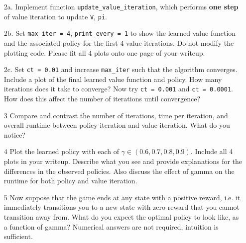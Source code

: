 \documentclass[submit]{harvardml}
\begin{document}
\begin{framed}
\begin{itemize}
    \item [2a.] Implement function
      \texttt{update\_value\_iteration}, which performs \textbf{one step} of value iteration to update \texttt{V}, \texttt{pi}.
      
    \item [2b.] Set \texttt{max\_iter = 4}, \texttt{print\_every = 1} to show the learned value function and the associated policy for the first 4 value iterations. Do not modify the plotting code. Please fit all 4 plots onto one page of your writeup.
    
    \item [2c.] Set \texttt{ct = 0.01} and increase \texttt{max\_iter} such that the algorithm converges. Include a plot of the final learned value function and policy. How many iterations does it take to converge? Now try \texttt{ct = 0.001} and \texttt{ct = 0.0001}. How does this affect the number of iterations until convergence?
    
    \item[3] Compare and contrast the number of iterations, time per iteration, and overall runtime between policy iteration and value iteration. What do you notice?
    
    \item[4] Plot the learned policy with each of $\gamma \in (0.6,0.7,0.8,0.9)$. Include all 4 plots in your writeup. Describe what you see and provide explanations for the differences in the observed policies. Also discuss the effect of gamma on the runtime for both policy and value iteration.
    
    \item[5] Now suppose that the game ends at any state with a positive reward, i.e. it immediately transitions you to a new state with zero reward that you cannot transition away from. What do you expect the optimal policy to look like, as a function of gamma? Numerical answers are not required, intuition is sufficient.
 
\end{itemize}
\end{framed}
\end{document}

